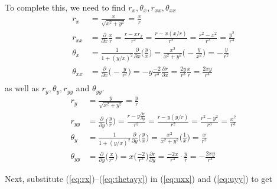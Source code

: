 To complete this, we need to find $r_x, \theta_x, r_{xx}, \theta_{xx}$ 
%
\begin{align}
r_x & = \frac{x}{\sqrt{x^2+y^2}} = \frac{x}{r} \label{eq:rx} \\
r_{xx} & = \frac{\partial }{\partial x} \frac{x}{r} = \frac{r -x r_x}{r^2}  = \frac{r-x(x/r)}{r^2} = \frac{r^2-x^2}{r^3} = \frac{y^2}{r^3}  \label{eq:rxx} \\
\theta_{x} & = \frac{1}{1+(y/x)^2} \frac{\partial }{\partial x} \biggl(\frac{y}{x}\biggr) = \frac{x^2}{x^2+y^2} \biggl( -\frac{y}{x^2} \biggr)  = -\frac{y}{r^2} \label{eq:thetax} \\
\theta_{xx} & = \frac{\partial }{\partial x} \biggl(  -\frac{y}{r^2} \biggr) = -y \frac{-2}{r^3} \frac{\partial r}{\partial x} = 
\frac{2y}{r^3} \frac{x}{r} = \frac{2xy}{r^4}  \label{eq:thetaxx}\\ 
\end{align}
as well as $r_y, \theta_y, r_{yy}$ and $\theta_{yy}$.  
%
\begin{align}
r_y & = \frac{y}{\sqrt{x^2+y^2}} = \frac{y}{r} \label{eq:ry} \\
r_{yy} & = \frac{\partial }{\partial y} \biggl( \frac{y}{r} \biggr) = \frac{r - y\frac{\partial r}{\partial y} }{r^2} = 
\frac{r-y(y/r)}{r^2} = \frac{r^2-y^2}{r^3} = \frac{x^2}{r^3} \label{eq:ryy}  \\
\theta_y & = \frac{1}{1+(y/x)^2} \frac{\partial }{\partial y} \biggl(\frac{y}{x}\biggr) = \frac{x^2}{x^2+y^2} \biggl( \frac{1}{x} \biggr)  = \frac{x}{r^2} \label{eq:thetay} \\
\theta_{yy} & = \frac{\partial }{\partial y}\biggl( \frac{x}{r^2} \biggr) = x \biggl( \frac{-2}{r^3}\biggr) \frac{\partial r}{\partial y}  = \frac{-2x}{r^3} \cdot \frac{y}{r} = -\frac{2xy}{r^4}  \label{eq:thetayy}
\end{align}

Next, substitute (\ref{eq:rx})--(\ref{eq:thetayy}) in (\ref{eq:uxx}) and (\ref{eq:uyy}) to get 

